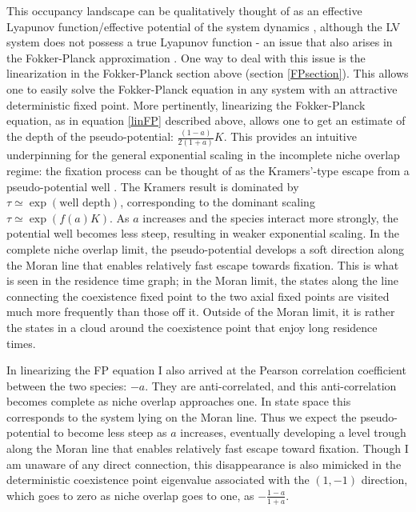 This occupancy landscape can be qualitatively thought of as an effective Lyapunov function/effective potential of the system dynamics \cite{Zhou2012}, although the LV system does not possess a true Lyapunov function - an issue that also arises in the Fokker-Planck approximation \cite{Zhou2012,Chotibut2015}. 
One way to deal with this issue is the linearization in the Fokker-Planck section above (section \ref{FPsection}). 
This allows one to easily solve the Fokker-Planck equation in any system with an attractive deterministic fixed point. 
More pertinently, linearizing the Fokker-Planck equation, as in equation \ref{linFP} described above, allows one to get an estimate of the depth of the pseudo-potential: $\frac{(1-a)}{2(1+a)}K$. 
This provides an intuitive underpinning for the general exponential scaling in the incomplete niche overlap regime: the fixation process can be thought of as the Kramers'-type escape from a pseudo-potential well \cite{Hanggi1990,Berglund2011}. 
The Kramers result is dominated by $\tau \simeq \exp(\text{well depth})$, corresponding to the dominant scaling $\tau \simeq \exp(f(a)K)$. 
As $a$ increases and the species interact more strongly, the potential well becomes less steep, resulting in weaker exponential scaling. 
In the complete niche overlap limit, the pseudo-potential develops a soft direction along the Moran line that enables relatively fast escape towards fixation.
This is what is seen in the residence time graph; in the Moran limit, the states along the line connecting the coexistence fixed point to the two axial fixed points are visited much more frequently than those off it. Outside of the Moran limit, it is rather the states in a cloud around the coexistence point that enjoy long residence times. 

In linearizing the FP equation I also arrived at the Pearson correlation coefficient between the two species: $-a$. 
They are anti-correlated, and this anti-correlation becomes complete as niche overlap approaches one. 
In state space this corresponds to the system lying on the Moran line. 
Thus we expect the pseudo-potential to become less steep as $a$ increases, eventually developing a level trough along the Moran line that enables relatively fast escape toward fixation. 
Though I am unaware of any direct connection, this disappearance is also mimicked in the deterministic coexistence point eigenvalue associated with the $(1,-1)$ direction, which goes to zero as niche overlap goes to one, as $-\frac{1-a}{1+a}$. %


